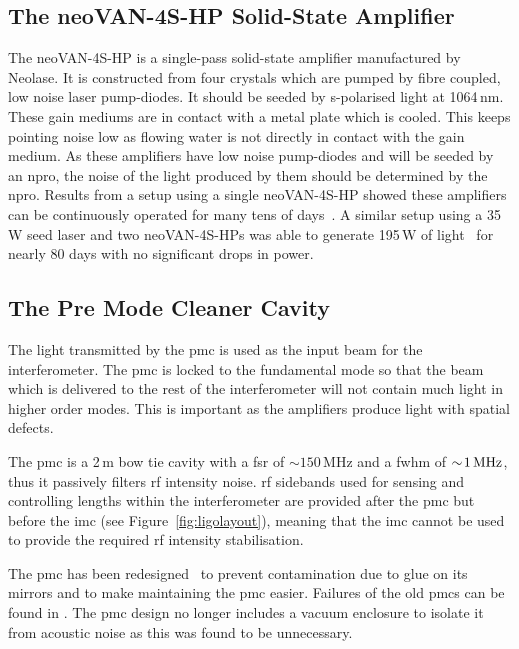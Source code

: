 \subsection{The neoVAN-4S-HP Solid-State Amplifier}
The neoVAN-4S-HP is a single-pass solid-state amplifier  manufactured by Neolase. It is constructed from four  crystals which are pumped by fibre coupled, low noise laser pump-diodes. It should be seeded by s-polarised light at 1064\,nm. These gain mediums are in contact with a metal plate which is cooled. This keeps pointing noise low as flowing water is not directly in contact with the gain medium. As these amplifiers have low noise pump-diodes and will be seeded by an \gls{npro}, the noise of the light produced by them should be determined by the \gls{npro}. Results from a setup using a single neoVAN-4S-HP showed these amplifiers can be continuously operated for many tens of days~\cite{Thies2019}. A similar setup using a 35\,W seed laser and two neoVAN-4S-HPs was able to generate 195\,W of light~\cite{Bode2020} for nearly 80 days with no significant drops in power. 
\subsection{The Pre Mode Cleaner Cavity}
The light transmitted by the \gls{pmc} is used as the input beam for the interferometer. The \gls{pmc} is locked to the fundamental mode so that the beam which is delivered to the rest of the interferometer will not contain much light in higher order modes. This is important as the amplifiers produce light with spatial defects.
\par
The \gls{pmc} is a 2\,m bow tie cavity with a \gls{fsr} of $\sim\!150\,\si{\mega\hertz}$ and a \gls{fwhm} of $\sim\!1\,\rm{MHz}$, thus it passively filters \gls{rf} intensity noise. \gls{rf} sidebands used for sensing and controlling lengths within the interferometer are provided after the \gls{pmc} but before the \gls{imc} (see Figure~\ref{fig:ligolayout}), meaning that the \gls{imc} cannot be used to provide the required \gls{rf} intensity stabilisation. 
\par
The \gls{pmc} has been redesigned~\cite{new_pmc_T1700543} to prevent contamination due to glue on its mirrors and to make maintaining the \gls{pmc} easier. Failures of the old \glspl{pmc} can be found in \cite{failed_pmc,failed_pmc_2}. The \gls{pmc} design no longer includes a vacuum enclosure to isolate it from acoustic noise as this was found to be unnecessary.
